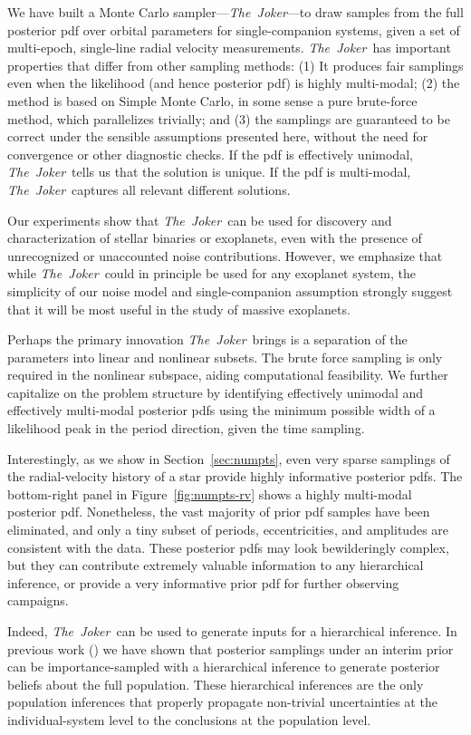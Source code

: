 \documentclass[manuscript, letterpaper]{aastex6}
\newcommand{\project}[1]{\textsl{#1}}
\newcommand{\samplername}{\project{The~Joker}}
\newcommand{\sectionname}{Section}
\newcommand{\figname}{Figure}
\begin{document}
We have built a Monte Carlo sampler---\samplername---to draw samples from the
full posterior pdf over orbital parameters for single-companion systems,
given a set of multi-epoch, single-line radial velocity measurements.
\samplername\ has important properties that differ from other sampling methods:
(1) It produces fair samplings even when the likelihood (and hence posterior
pdf) is highly multi-modal; (2) the method is based on Simple Monte Carlo,  in
some sense a pure brute-force method, which parallelizes trivially; and (3) the
samplings are guaranteed to be correct under the sensible assumptions presented here,
without the need for convergence or other diagnostic checks.
If the pdf is effectively unimodal, \samplername\ tells us that the solution is
unique.
If the pdf is multi-modal, \samplername\ captures all relevant different
solutions.

Our experiments show that \samplername\ can be used for discovery and
characterization of stellar binaries or exoplanets, even with the presence of
unrecognized or unaccounted noise contributions.
However, we emphasize that while \samplername\ could in principle be used for
any exoplanet system, the simplicity of our noise model and single-companion
assumption strongly suggest that it will be most useful in the study of massive
exoplanets.

Perhaps the primary innovation \samplername\ brings is a separation of the
parameters into linear and nonlinear subsets.
The brute force sampling is only required in the nonlinear subspace, aiding
computational feasibility.
We further capitalize on the problem structure by identifying effectively
unimodal and effectively multi-modal posterior pdfs using the minimum possible
width of a likelihood peak in the period direction, given the time sampling.

Interestingly, as we show in \sectionname~\ref{sec:numpts}, even very sparse
samplings of the radial-velocity history of a star provide highly
informative posterior pdfs.  The bottom-right panel in
\figname~\ref{fig:numpts-rv} shows a highly multi-modal posterior pdf.
Nonetheless, the vast majority of prior pdf samples have been eliminated, and
only a tiny subset of periods, eccentricities, and amplitudes are consistent
with the data.
These posterior pdfs may look bewilderingly complex, but they can contribute
extremely valuable information to any hierarchical inference, or
provide a very informative prior pdf for further observing campaigns.

Indeed, \samplername\  can be used to generate inputs for a hierarchical inference.
In previous work (\citealt{Hogg:2010, Foreman-Mackey:2014}) we have shown
that posterior samplings under an interim prior can be importance-sampled
with a hierarchical inference to generate posterior beliefs about the
full population.
These hierarchical inferences are the only population inferences
that properly propagate non-trivial uncertainties at the
individual-system level to the conclusions at the population level.
\end{document}
